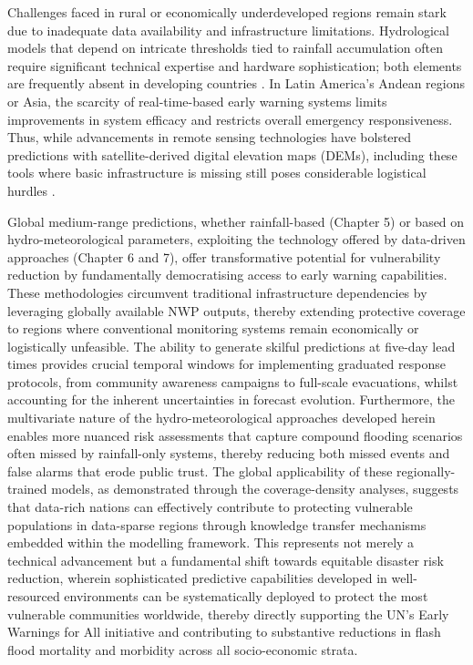 Challenges faced in rural or economically underdeveloped regions remain stark due to inadequate data availability and infrastructure limitations. Hydrological models that depend on intricate thresholds tied to rainfall accumulation often require significant technical expertise and hardware sophistication; both elements are frequently absent in developing countries \citep{Javelle2016}\citep{AlRawas2024}. In Latin America's Andean regions or Asia, the scarcity of real-time-based early warning systems limits improvements in system efficacy and restricts overall emergency responsiveness. Thus, while advancements in remote sensing technologies have bolstered predictions with satellite-derived digital elevation maps (DEMs), including these tools where basic infrastructure is missing still poses considerable logistical hurdles \citep{Pham2020}.

Global medium-range predictions, whether rainfall-based (Chapter 5) or based on hydro-meteorological parameters, exploiting the technology offered by data-driven approaches (Chapter 6 and 7), offer transformative potential for vulnerability reduction by fundamentally democratising access to early warning capabilities. These methodologies circumvent traditional infrastructure dependencies by leveraging globally available NWP outputs, thereby extending protective coverage to regions where conventional monitoring systems remain economically or logistically unfeasible. The ability to generate skilful predictions at five-day lead times provides crucial temporal windows for implementing graduated response protocols, from community awareness campaigns to full-scale evacuations, whilst accounting for the inherent uncertainties in forecast evolution. Furthermore, the multivariate nature of the hydro-meteorological approaches developed herein enables more nuanced risk assessments that capture compound flooding scenarios often missed by rainfall-only systems, thereby reducing both missed events and false alarms that erode public trust. The global applicability of these regionally-trained models, as demonstrated through the coverage-density analyses, suggests that data-rich nations can effectively contribute to protecting vulnerable populations in data-sparse regions through knowledge transfer mechanisms embedded within the modelling framework. This represents not merely a technical advancement but a fundamental shift towards equitable disaster risk reduction, wherein sophisticated predictive capabilities developed in well-resourced environments can be systematically deployed to protect the most vulnerable communities worldwide, thereby directly supporting the UN's Early Warnings for All initiative and contributing to substantive reductions in flash flood mortality and morbidity across all socio-economic strata.

